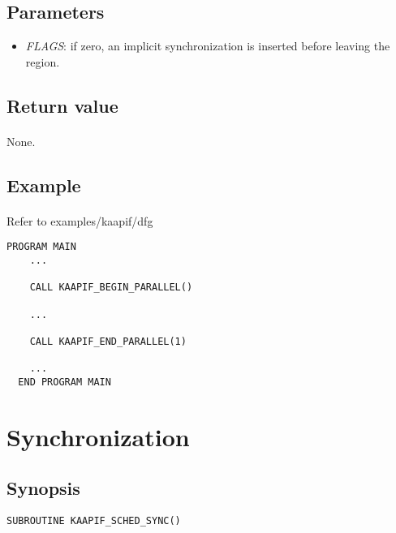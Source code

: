 \documentclass[a4paper, 11pt]{article}
\begin{document}
\subsection{Parameters}
\begin{itemize}
\item \textit{FLAGS}: if zero, an implicit synchronization is inserted before
leaving the region.
\end{itemize}

\subsection{Return value}
\paragraph{}
None.

\subsection{Example}
\paragraph{}
Refer to examples/kaapif/dfg\\
\begin{small}
\begin{lstlisting}[frame=tb]
  PROGRAM MAIN
    ...

    CALL KAAPIF_BEGIN_PARALLEL()

    ...

    CALL KAAPIF_END_PARALLEL(1)

    ...
  END PROGRAM MAIN
\end{lstlisting}
\end{small}


\newpage
\section{Synchronization}

\subsection{Synopsis}
\begin{small}
\lstset{language=C}
\begin{lstlisting}[frame=tb]
SUBROUTINE KAAPIF_SCHED_SYNC()
\end{lstlisting}
\end{small}
\end{document}
